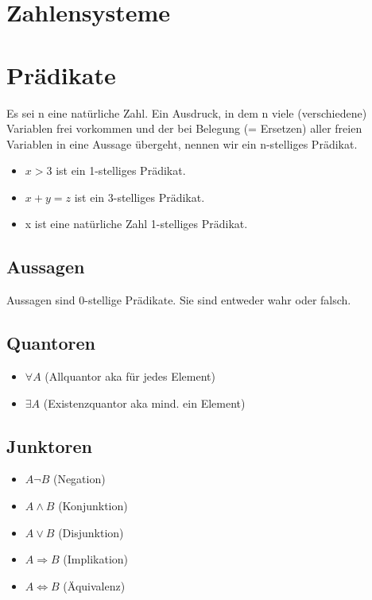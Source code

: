 \section{Zahlensysteme}

\section{Prädikate}
Es sei n eine natürliche Zahl. Ein Ausdruck, in dem n viele
(verschiedene) Variablen frei vorkommen und der bei Belegung (=
Ersetzen) aller freien Variablen in eine Aussage übergeht, nennen wir
ein n-stelliges Prädikat.
\begin{itemize}
    \item $x > 3$ ist ein 1-stelliges Prädikat.
    \item $x + y = z$ ist ein 3-stelliges Prädikat.
    \item x ist eine natürliche Zahl 1-stelliges Prädikat.
\end{itemize}
\subsection{Aussagen}
Aussagen sind 0-stellige Prädikate. Sie sind entweder wahr oder falsch.
\subsection{Quantoren}
\begin{itemize}
    \item \(\forall A\) (Allquantor aka für jedes Element)
    \item \(\exists A\) (Existenzquantor aka mind. ein Element)
\end{itemize}
\subsection{Junktoren}
\begin{itemize}
    \item \(A \neg B\) (Negation)
    \item \(A \wedge B\) (Konjunktion)
    \item \(A \vee B\) (Disjunktion)
    \item \(A \Rightarrow B\) (Implikation)
    \item \(A \Leftrightarrow B\) (Äquivalenz)
\end{itemize}

